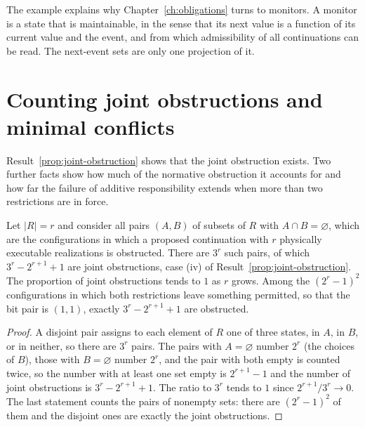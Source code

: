 The example explains why Chapter~\ref{ch:obligations} turns to monitors. A monitor is a state that is maintainable, in the sense that its next value is a function of its current value and the event, and from which admissibility of all continuations can be read. The next-event sets are only one projection of it.


\section{Counting joint obstructions and minimal conflicts}\label{sec:conflicts}

Result~\ref{prop:joint-obstruction} shows that the joint obstruction exists. Two further facts show how much of the normative obstruction it accounts for and how far the failure of additive responsibility extends when more than two restrictions are in force.

\begin{newresult}\label{prop:count-forms}
Let $|R|=r$ and consider all pairs $(A,B)$ of subsets of $R$ with $A\cap B=\varnothing$, which are the configurations in which a proposed continuation with $r$ physically executable realizations is obstructed. There are $3^{r}$ such pairs, of which $3^{r}-2^{r+1}+1$ are joint obstructions, case (iv) of Result~\ref{prop:joint-obstruction}. The proportion of joint obstructions tends to $1$ as $r$ grows. Among the $(2^{r}-1)^{2}$ configurations in which both restrictions leave something permitted, so that the bit pair is $(1,1)$, exactly $3^{r}-2^{r+1}+1$ are obstructed.
\end{newresult}
\begin{proof}
A disjoint pair assigns to each element of $R$ one of three states, in $A$, in $B$, or in neither, so there are $3^{r}$ pairs. The pairs with $A=\varnothing$ number $2^{r}$ (the choices of $B$), those with $B=\varnothing$ number $2^{r}$, and the pair with both empty is counted twice, so the number with at least one set empty is $2^{r+1}-1$ and the number of joint obstructions is $3^{r}-2^{r+1}+1$. The ratio to $3^{r}$ tends to $1$ since $2^{r+1}/3^{r}\to0$. The last statement counts the pairs of nonempty sets: there are $(2^{r}-1)^{2}$ of them and the disjoint ones are exactly the joint obstructions.
\end{proof}

